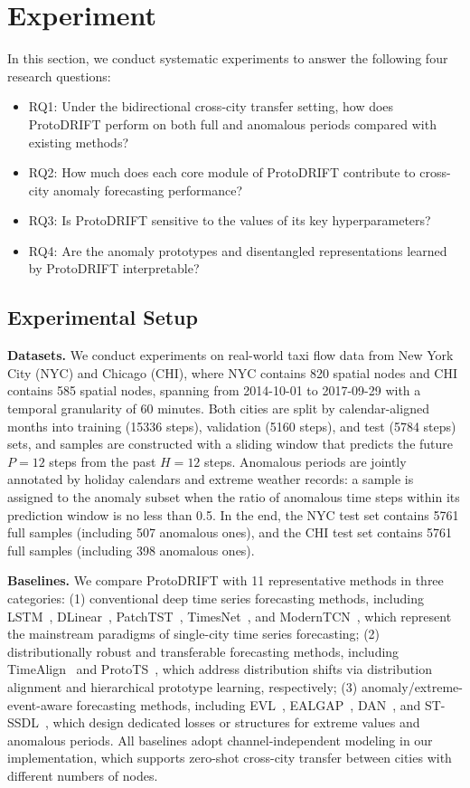 \section{Experiment}

In this section, we conduct systematic experiments to answer the following four research questions:

\begin{itemize}
    \item RQ1: Under the bidirectional cross-city transfer setting, how does ProtoDRIFT perform on both full and anomalous periods compared with existing methods?
    \item RQ2: How much does each core module of ProtoDRIFT contribute to cross-city anomaly forecasting performance?
    \item RQ3: Is ProtoDRIFT sensitive to the values of its key hyperparameters?
    \item RQ4: Are the anomaly prototypes and disentangled representations learned by ProtoDRIFT interpretable?
\end{itemize}

\subsection{Experimental Setup}

\noindent \textbf{Datasets.} We conduct experiments on real-world taxi flow data from New York City (NYC) and Chicago (CHI), where NYC contains 820 spatial nodes and CHI contains 585 spatial nodes, spanning from 2014-10-01 to 2017-09-29 with a temporal granularity of 60 minutes. Both cities are split by calendar-aligned months into training (15336 steps), validation (5160 steps), and test (5784 steps) sets, and samples are constructed with a sliding window that predicts the future $P=12$ steps from the past $H=12$ steps. Anomalous periods are jointly annotated by holiday calendars and extreme weather records: a sample is assigned to the anomaly subset when the ratio of anomalous time steps within its prediction window is no less than 0.5. In the end, the NYC test set contains 5761 full samples (including 507 anomalous ones), and the CHI test set contains 5761 full samples (including 398 anomalous ones).

\noindent \textbf{Baselines.} We compare ProtoDRIFT with 11 representative methods in three categories: (1) conventional deep time series forecasting methods, including LSTM~\cite{lstm}, DLinear~\cite{dlinear}, PatchTST~\cite{PatchTST}, TimesNet~\cite{timesnet}, and ModernTCN~\cite{moderntcn}, which represent the mainstream paradigms
of single-city time series forecasting; (2) distributionally robust and transferable forecasting methods, including TimeAlign~\cite{timealign} and ProtoTS~\cite{protots}, which address distribution shifts via distribution alignment and hierarchical prototype learning, respectively; (3) anomaly/extreme-event-aware forecasting methods, including EVL~\cite{evl}, EALGAP~\cite{ealgap}, DAN~\cite{dan}, and ST-SSDL~\cite{stssdl}, which design dedicated losses or structures for extreme values and anomalous periods. All baselines adopt channel-independent modeling in our implementation, which supports zero-shot cross-city transfer between cities with different numbers of nodes.


